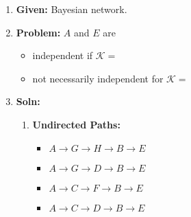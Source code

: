\begin{example}
    \begin{enumerate}
        \item \textbf{Given:} Bayesian network.
        \item \textbf{Problem:} $A$ and $E$ are 
        \begin{itemize}
            \item independent if $\mathcal{K}=$
            \item not necessarily independent for $\mathcal{K}=$
        \end{itemize}
        \item \textbf{Soln:}
        \begin{enumerate}
            \item \textbf{Undirected Paths:}
            \begin{itemize}
                \item $A \to G \to H \to B \to E$
                \item $A \to G \to D \to B \to E$
                \item $A \to C \to F \to B \to E$
                \item $A \to C \to D \to B \to E$
            \end{itemize}
        \end{enumerate}
    \end{enumerate}
\end{example}
\newpage


